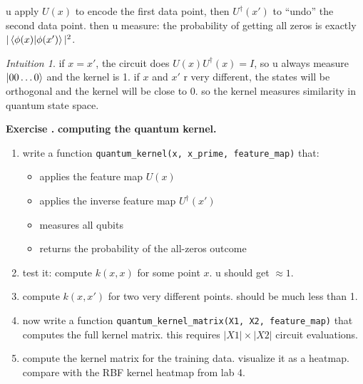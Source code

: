 \documentclass[11pt,a4paper]{article}
\theoremstyle{definition}
\theoremstyle{remark}
\newtheorem*{intuition}{Intuition}
\newcounter{exercise}[section]
\newenvironment{exercise}{\refstepcounter{exercise}\par\medskip\noindent\textbf{Exercise \theexercise.}\rmfamily}{\medskip}
\begin{document}
u apply $U(x)$ to encode the first data point, then $U^\dagger(x')$ to ``undo'' the second data point. then u measure: the probability of getting all zeros is exactly $|\braket{\phi(x)|\phi(x')}|^2$.

\begin{intuition}
if $x = x'$, the circuit does $U(x)U^\dagger(x) = I$, so u always measure $\ket{00\ldots0}$ and the kernel is 1. if $x$ and $x'$ r very different, the states will be orthogonal and the kernel will be close to 0. so the kernel measures similarity in quantum state space.
\end{intuition}

\begin{exercise}
\textbf{computing the quantum kernel.}
\begin{enumerate}[leftmargin=*]
  \item write a function \texttt{quantum\_kernel(x, x\_prime, feature\_map)} that:
    \begin{itemize}
      \item applies the feature map $U(x)$
      \item applies the inverse feature map $U^\dagger(x')$
      \item measures all qubits
      \item returns the probability of the all-zeros outcome
    \end{itemize}
  \item test it: compute $k(x, x)$ for some point $x$. u should get $\approx 1$.
  \item compute $k(x, x')$ for two very different points. should be much less than 1.
  \item now write a function \texttt{quantum\_kernel\_matrix(X1, X2, feature\_map)} that computes the full kernel matrix. this requires $|X1| \times |X2|$ circuit evaluations.
  \item compute the kernel matrix for the training data. visualize it as a heatmap. compare with the RBF kernel heatmap from lab 4.
\end{enumerate}
\end{exercise}
\end{document}

